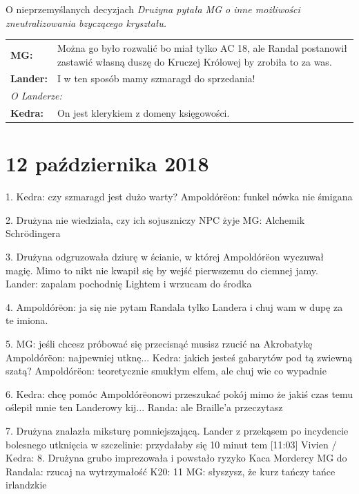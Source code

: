 \documentclass[10pt,twoside,twocolumn]{book}
\begin{document}
\begin{rpg-quotebox}{O nieprzemyślanych decyzjach}
   \textit{Drużyna pytała MG o inne możliwości zneutralizowania bzyczącego kryształu.}\\

   \begin{tabularx}{\columnwidth}{lX}
      \textbf{MG:} & Można go było rozwalić bo miał tylko AC 18, ale Randal postanowił zastawić własną duszę do Kruczej Królowej by zrobiła to za was.\\
      \textbf{Lander:} & I w ten sposób mamy szmaragd do sprzedania!\\
      \multicolumn{2}{l}{\textit{O Landerze:}}\\
      \textbf{Kedra:} &  On jest klerykiem z domeny księgowości.\\
   \end{tabularx}
\end{rpg-quotebox}


\section*{12 października 2018}

1. Kedra: czy szmaragd jest dużo warty?
Ampoldórëon: funkel nówka nie śmigana

2. Drużyna nie wiedziała, czy ich sojuszniczy NPC żyje
MG: Alchemik Schrödingera

3. Drużyna odgruzowała dziurę w ścianie, w której Ampoldórëon wyczuwał magię. Mimo to nikt nie kwapił się by wejść pierwszemu do ciemnej jamy.
Lander: zapalam pochodnię Lightem i wrzucam do środka

4. Ampoldórëon: ja się nie pytam Randala tylko Landera i chuj wam w dupę za te imiona.

5. MG: jeśli chcesz próbować się przecisnąć musisz rzucić na Akrobatykę
Ampoldórëon: najpewniej utknę...
Kedra: jakich jesteś gabarytów pod tą zwiewną szatą?
Ampoldórëon: teoretycznie smukłym elfem, ale chuj wie co wypadnie

6. Kedra: chcę pomóc Ampoldórëonowi przeszukać pokój mimo że jakiś czas temu oślepił mnie ten Landerowy kij...
Randa: ale Braille'a przeczytasz

7. Drużyna znalazła miksturę pomniejszającą.
Lander z przekąsem po incydencie bolesnego utknięcia w szczelinie: przydałaby się 10 minut tem
[11:03] Vivien / Kedra: 8. Drużyna grubo imprezowała i powstało ryzyko Kaca Mordercy
MG do Randala: rzucaj na wytrzymałość
K20: 11
MG: słyszysz, że kurz tańczy tańce irlandzkie
\end{document}
